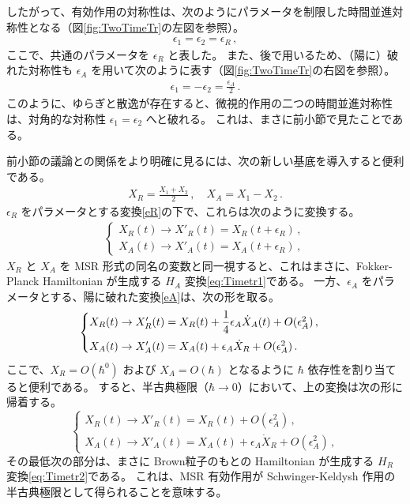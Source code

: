 したがって、有効作用の対称性は、次のようにパラメータを制限した時間並進対称性となる（図\ref{fig:TwoTimeTr}の左図を参照）。
\begin{align}
\label{eR}
 \epsilon_1 = \epsilon_2 = \epsilon_R 
 \,,
\end{align}
ここで、共通のパラメータを $\epsilon_R$ と表した。
また、後で用いるため、（陽に）破れた対称性も $\epsilon_A$ を用いて次のように表す（図\ref{fig:TwoTimeTr}の右図を参照）。
\begin{align}
\label{eA}
 \epsilon_1 = - \epsilon_2 = \frac{\epsilon_A}{2} \,.
\end{align}
このように、ゆらぎと散逸が存在すると、微視的作用の二つの時間並進対称性は、対角的な対称性 $\epsilon_1=\epsilon_2$ へと破れる。
これは、まさに前小節で見たことである。



\medskip
前小節の議論との関係をより明確に見るには、次の新しい基底を導入すると便利である。
\begin{align}
 X_R = \frac{X_1 + X_2}{2}\,,
 \quad
 X_A= X_1 - X_2  \,.
\end{align}
$\epsilon_R$ をパラメータとする変換\eqref{eR}の下で、これらは次のように変換する。
\begin{align}
 \begin{cases}
  X_R(t) \to X'_R (t) = X_R (t+\epsilon_R)\,, \\
  X_A(t) \to X'_A(t) = X_A (t+\epsilon_R)\,,
 \end{cases}
\end{align}
$X_{R}$ と $X_A$ を MSR 形式の同名の変数と同一視すると、これはまさに、Fokker-Planck Hamiltonian が生成する $H_A$ 変換\eqref{eq:Timetr1}である。
一方、$\epsilon_A$ をパラメータとする、陽に破れた変換\eqref{eA}は、次の形を取る。
\begin{equation}
  \begin{cases}
   X_R(t) 
   \to X'_{R}(t) 
   = X_R(t)+ \dfrac{1}{4} \epsilon_A \dot{X}_A(t) + O (\epsilon_A^2) \,,
   \vspace{5pt} \\
   X_A(t) 
   \to X'_A(t) 
   = X_A(t) +\epsilon_A\dot{X}_R+ O (\epsilon_A^2)\,.
  \end{cases}
\end{equation}
ここで、$X_{R} =O (\hbar^0)$ および $X_A = O(\hbar)$ となるように $\hbar$ 依存性を割り当てると便利である。
すると、半古典極限（$\hbar\to0$）において、上の変換は次の形に帰着する。
\begin{equation}
 \begin{cases}
  X_R(t) \to 
  X'_R(t) = X_R(t) + O(\epsilon_A^2)\,,
  \\
  X_A(t)\to 
  X'_A(t) = X_A(t) + \epsilon_A \dot{X}_{R} + O(\epsilon_A^2)\,,
 \end{cases}
\end{equation}
その最低次の部分は、まさに Brown粒子のもとの Hamiltonian が生成する $H_R$ 変換\eqref{eq:Timetr2}である。
これは、MSR 有効作用が Schwinger-Keldysh 作用の半古典極限として得られることを意味する。
\medskip

